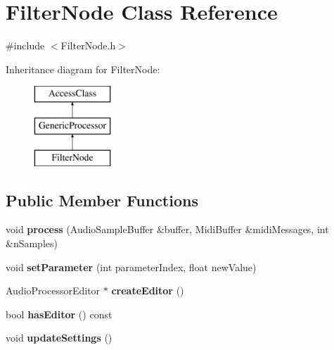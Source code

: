 \hypertarget{classFilterNode}{\section{Filter\-Node Class Reference}
\label{classFilterNode}
}


{\ttfamily \#include $<$Filter\-Node.\-h$>$}

Inheritance diagram for Filter\-Node\-:\begin{figure}[H]
\begin{center}
\leavevmode
\includegraphics[height=3.000000cm]{classFilterNode}
\end{center}
\end{figure}
\subsection*{Public Member Functions}
\begin{DoxyCompactItemize}
\item 
\hypertarget{classFilterNode_a63dfa678d13ca12217d95a5b24475bfa}{void {\bfseries process} (Audio\-Sample\-Buffer \&buffer, Midi\-Buffer \&midi\-Messages, int \&n\-Samples)}\label{classFilterNode_a63dfa678d13ca12217d95a5b24475bfa}

\item 
\hypertarget{classFilterNode_a6369ae48f9ef18561a65027935a73e56}{void {\bfseries set\-Parameter} (int parameter\-Index, float new\-Value)}\label{classFilterNode_a6369ae48f9ef18561a65027935a73e56}

\item 
\hypertarget{classFilterNode_addd663abb4043bdb7296a63b93c49b85}{Audio\-Processor\-Editor $\ast$ {\bfseries create\-Editor} ()}\label{classFilterNode_addd663abb4043bdb7296a63b93c49b85}

\item 
\hypertarget{classFilterNode_aebf922de468ace2f70f09a7364e68649}{bool {\bfseries has\-Editor} () const }\label{classFilterNode_aebf922de468ace2f70f09a7364e68649}

\item 
\hypertarget{classFilterNode_aa009e8b04082517e15f17bcefc2ba497}{void {\bfseries update\-Settings} ()}\label{classFilterNode_aa009e8b04082517e15f17bcefc2ba497}

\end{DoxyCompactItemize}
